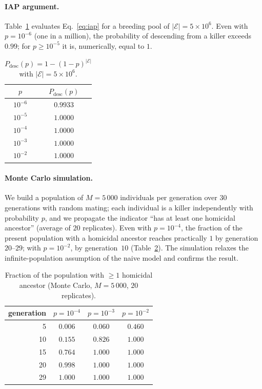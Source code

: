 \documentclass[11pt]{article}
\begin{document}
\paragraph{IAP argument.} Table~\ref{tab:iap} evaluates Eq.~\eqref{eq:iap} for a
breeding pool of $|\mathcal{E}| = 5\times 10^{6}$. Even with $p = 10^{-6}$ (one in
a million), the probability of descending from a killer exceeds $0{.}99$; for
$p \ge 10^{-5}$ it is, numerically, equal to $1$.

\begin{table}[h]
\centering
\caption{$P_{\text{desc}}(p) = 1-(1-p)^{|\mathcal{E}|}$ with
$|\mathcal{E}| = 5\times 10^{6}$.}
\label{tab:iap}
\begin{tabular}{cc}
\toprule
$p$ & $P_{\text{desc}}(p)$ \\
\midrule
$10^{-6}$ & $0{.}9933$ \\
$10^{-5}$ & $1{.}0000$ \\
$10^{-4}$ & $1{.}0000$ \\
$10^{-3}$ & $1{.}0000$ \\
$10^{-2}$ & $1{.}0000$ \\
\bottomrule
\end{tabular}
\end{table}

\paragraph{Monte Carlo simulation.} We build a population of $M = 5\,000$
individuals per generation over $30$ generations with random mating; each
individual is a killer independently with probability $p$, and we propagate the
indicator ``has at least one homicidal ancestor'' (average of $20$ replicates).
Even with $p = 10^{-4}$, the fraction of the present population with a homicidal
ancestor reaches practically $1$ by generation~$20$--$29$; with $p = 10^{-2}$, by
generation~$10$ (Table~\ref{tab:sim}). The simulation relaxes the
infinite-population assumption of the naive model and confirms the result.

\begin{table}[h]
\centering
\caption{Fraction of the population with $\ge 1$ homicidal ancestor (Monte
Carlo, $M=5\,000$, $20$ replicates).}
\label{tab:sim}
\begin{tabular}{rccc}
\toprule
generation & $p=10^{-4}$ & $p=10^{-3}$ & $p=10^{-2}$ \\
\midrule
5  & $0{.}006$ & $0{.}060$ & $0{.}460$ \\
10 & $0{.}155$ & $0{.}826$ & $1{.}000$ \\
15 & $0{.}764$ & $1{.}000$ & $1{.}000$ \\
20 & $0{.}998$ & $1{.}000$ & $1{.}000$ \\
29 & $1{.}000$ & $1{.}000$ & $1{.}000$ \\
\bottomrule
\end{tabular}
\end{table}
\end{document}
